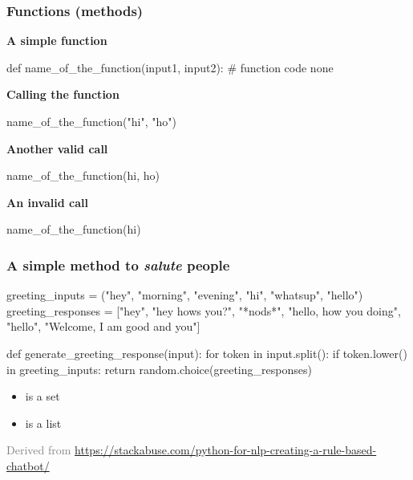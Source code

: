 \documentclass{beamer}
\newcommand{\light}[1]{\textcolor{gray}{#1}}
\begin{document}
\begin{frame}[fragile]
\frametitle{Functions (methods)}

\textbf{A simple function}
\begin{python}
  def name_of_the_function(input1, input2):
      # function code
      none
\end{python}
\pause

\textbf{Calling the function}
\begin{python}
name_of_the_function("hi", "ho")
\end{python}
\pause

\textbf{Another valid call}
\begin{python}
name_of_the_function(hi, ho)
\end{python}
\pause

\textbf{An invalid call}
\begin{python}
name_of_the_function(hi)
\end{python}

\end{frame}


\begin{frame}[fragile]
\frametitle{A simple method to \textit{salute} people}
\vspace{5mm}

\begin{python}
greeting_inputs = ("hey", "morning", "evening", "hi",
                "whatsup", "hello")
greeting_responses = ["hey", "hey hows you?", "*nods*",
                "hello, how you doing", "hello",
                "Welcome, I am good and you"]

def generate_greeting_response(input):
    for token in input.split():
        if token.lower() in greeting_inputs:
            return random.choice(greeting_responses)
\end{python}
\pause

\begin{itemize}
 \item {} is a \alert{set}
 \item {} is a \alert{list}
\end{itemize}

\onslide
\footnotesize
\light{Derived from
\url{https://stackabuse.com/python-for-nlp-creating-a-rule-based-chatbot/}}
\end{frame}
\end{document}
